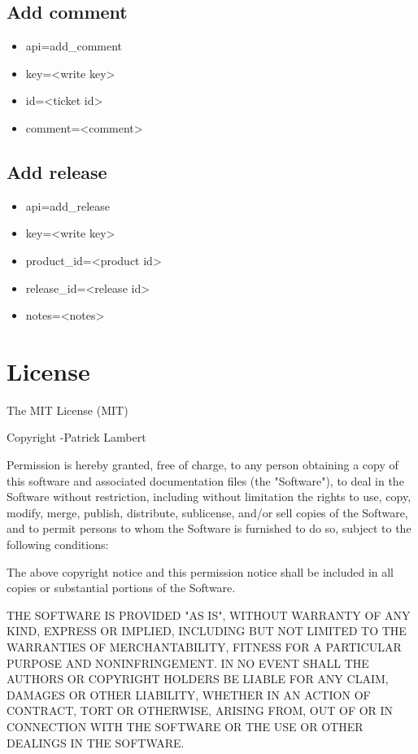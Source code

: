 \documentclass[11pt]{article}
\begin{document}
\subsection{Add comment}

\begin{itemize}
\item api=add\_comment
\item key=<write key>
\item id=<ticket id>
\item comment=<comment>
\end{itemize}

\subsection{Add release}

\begin{itemize}
\item api=add\_release
\item key=<write key>
\item product\_id=<product id>
\item release\_id=<release id>
\item notes=<notes>
\end{itemize}

\clearpage
\section{License}
The MIT License (MIT)

Copyright \textcopyright {}-\the\year \thinspace Patrick Lambert

Permission is hereby granted, free of charge, to any person obtaining a copy
of this software and associated documentation files (the "Software"), to deal
in the Software without restriction, including without limitation the rights
to use, copy, modify, merge, publish, distribute, sublicense, and/or sell
copies of the Software, and to permit persons to whom the Software is
furnished to do so, subject to the following conditions:

The above copyright notice and this permission notice shall be included in
all copies or substantial portions of the Software.

THE SOFTWARE IS PROVIDED "AS IS", WITHOUT WARRANTY OF ANY KIND, EXPRESS OR
IMPLIED, INCLUDING BUT NOT LIMITED TO THE WARRANTIES OF MERCHANTABILITY,
FITNESS FOR A PARTICULAR PURPOSE AND NONINFRINGEMENT. IN NO EVENT SHALL THE
AUTHORS OR COPYRIGHT HOLDERS BE LIABLE FOR ANY CLAIM, DAMAGES OR OTHER
LIABILITY, WHETHER IN AN ACTION OF CONTRACT, TORT OR OTHERWISE, ARISING FROM,
OUT OF OR IN CONNECTION WITH THE SOFTWARE OR THE USE OR OTHER DEALINGS IN
THE SOFTWARE.
\end{document}
